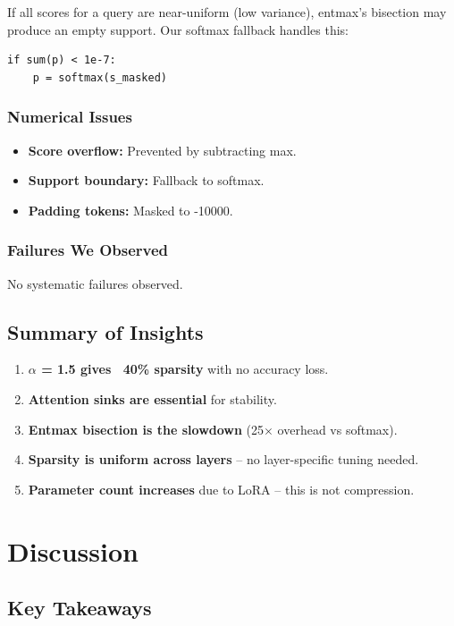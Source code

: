 If all scores for a query are near-uniform (low variance), entmax's bisection 
may produce an empty support. Our softmax fallback handles this:

\begin{lstlisting}
if sum(p) < 1e-7:
    p = softmax(s_masked)
\end{lstlisting}

\subsubsection{Numerical Issues}

\begin{itemize}
\item \textbf{Score overflow:} Prevented by subtracting max.
\item \textbf{Support boundary:} Fallback to softmax.
\item \textbf{Padding tokens:} Masked to -10000.

\end{itemize}
\subsubsection{Failures We Observed}

No systematic failures observed.

\subsection{Summary of Insights}

\begin{enumerate}
\item \textbf{$\alpha$ = 1.5 gives ~40\% sparsity} with no accuracy loss.
\item \textbf{Attention sinks are essential} for stability.
\item \textbf{Entmax bisection is the slowdown} (25$\times$ overhead vs softmax).
\item \textbf{Sparsity is uniform across layers} -- no layer-specific tuning needed.
\item \textbf{Parameter count increases} due to LoRA -- this is not compression.
\end{enumerate}


\section{Discussion}

\subsection{Key Takeaways}

